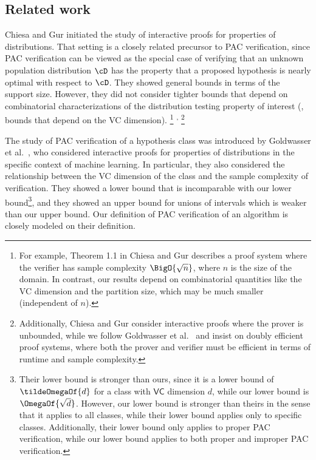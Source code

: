 \documentclass{toc}
\begin{document}
%
\subsection{Related work}  %

Chiesa and Gur \cite{ChiesaG18} initiated the study of interactive proofs for properties of distributions. That setting is a closely related precursor to PAC verification, since PAC verification can be viewed as the special case of verifying that an unknown population distribution $\cD$ has the property that a proposed hypothesis is nearly optimal with respect to $\cD$.
They showed general bounds in terms of the support size. However, they did not consider tighter bounds that depend on combinatorial characterizations of the distribution testing property of interest (\eg, bounds that depend on the VC dimension).%
\footnote{
	For example, Theorem 1.1 in Chiesa and Gur \cite{ChiesaG18} describes a proof system where the verifier has sample complexity $\BigO{\sqrt{n}}$, where $n$ is the size of the domain. In contrast, our results depend on combinatorial quantities like the VC dimension and the partition size, which may be much smaller (independent of $n$).
}%
\textsuperscript{,}%
\footnote{
	Additionally, Chiesa and Gur \cite{ChiesaG18} consider interactive proofs where the prover is unbounded, while we follow Goldwasser et al.\ \cite{GoldwasserRSY21} and insist on doubly efficient proof systems, where both the prover and verifier must be efficient in terms of runtime and sample complexity.
}

The study of PAC verification of a hypothesis class was introduced by Goldwasser et al.\ \cite{GoldwasserRSY21}, who considered interactive proofs for properties of distributions in the specific context of machine learning. In particular, they also considered the relationship between the VC dimension of the class and the sample complexity of verification. They showed a lower bound that is incomparable with our lower bound\footnote{%
	Their lower bound is stronger than ours, since it is a lower bound of $\tildeOmegaOf{d}$ for a class with $\mathsf{VC}$ dimension $d$, while our lower bound is $\OmegaOf{\sqrt{d}}$. However, our lower bound is stronger than theirs in the sense that it applies to all classes, while their lower bound applies only to specific classes. Additionally, their lower bound only applies to proper PAC verification, while our lower bound applies to both proper and improper PAC verification.%
}, and they showed an upper bound for unions of intervals which is weaker than our upper bound. Our definition of PAC verification of an algorithm is closely modeled on their definition.
\end{document}
